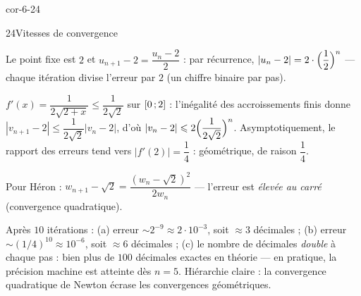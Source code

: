 \begin{blocLivre}{cor-6-24}
\begin{corrige}{24}{Vitesses de convergence}
\begin{questions}
  \item Le point fixe est $2$ et $u_{n+1}-2=\dfrac{u_n-2}{2}$ : par
    récurrence, $|u_n-2|=2\cdot\Bigl(\dfrac12\Bigr)^{n}$ — chaque itération
    divise l'erreur par $2$ (un chiffre binaire par pas).
  \item $f'(x)=\dfrac{1}{2\sqrt{2+x}}\leq\dfrac{1}{2\sqrt2}$ sur
    $\intFF{0}{2}$ : l'inégalité des accroissements finis donne
    $|v_{n+1}-2|\leq\dfrac{1}{2\sqrt2}|v_n-2|$, d'où
    $|v_n-2|\leq2\Bigl(\dfrac{1}{2\sqrt2}\Bigr)^{n}$. Asymptotiquement, le
    rapport des erreurs tend vers $|f'(2)|=\dfrac14$ : géométrique, de
    raison $\dfrac14$.
  \item Pour Héron : $w_{n+1}-\sqrt2=\dfrac{(w_n-\sqrt2)^{2}}{2w_n}$ —
    l'erreur est \emph{élevée au carré} (convergence quadratique).
  \item Après $10$ itérations : (a) erreur $\sim2^{-9}\approx2\cdot10^{-3}$,
    soit $\approx3$ décimales ; (b) erreur $\sim(1/4)^{10}\approx10^{-6}$,
    soit $\approx6$ décimales ; (c) le nombre de décimales \emph{double} à
    chaque pas : bien plus de $100$ décimales exactes en théorie — en
    pratique, la précision machine est atteinte dès $n=5$. Hiérarchie
    claire : la convergence quadratique de Newton écrase les convergences
    géométriques.
\end{questions}
\end{corrige}
\end{blocLivre}


